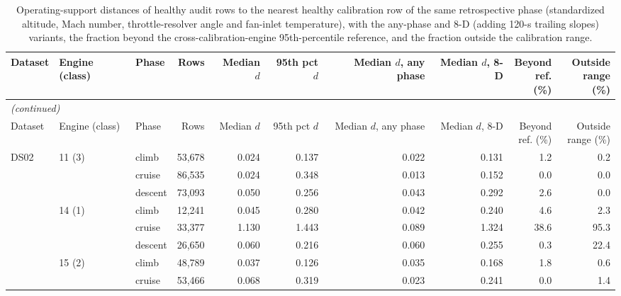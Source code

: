 \begin{scriptsize}
\begin{longtable}{lllrrrrrrr}
\caption{Operating-support distances of healthy audit rows to the nearest healthy calibration row of the same retrospective phase (standardized altitude, Mach number, throttle-resolver angle and fan-inlet temperature), with the any-phase and 8-D (adding 120-s trailing slopes) variants, the fraction beyond the cross-calibration-engine 95th-percentile reference, and the fraction outside the calibration range.}\label{tab:s20_support_cells}\\
\toprule
Dataset & Engine (class) & Phase & Rows & \makecell{Median\\$d$} & \makecell{95th pct\\$d$} & \makecell{Median $d$,\\any phase} & \makecell{Median\\$d$, 8-D} & \makecell{Beyond\\ref. (\%)} & \makecell{Outside\\range (\%)} \\
\midrule
\endfirsthead
\multicolumn{10}{l}{\emph{(continued)}}\\
\toprule
Dataset & Engine (class) & Phase & Rows & \makecell{Median\\$d$} & \makecell{95th pct\\$d$} & \makecell{Median $d$,\\any phase} & \makecell{Median\\$d$, 8-D} & \makecell{Beyond\\ref. (\%)} & \makecell{Outside\\range (\%)} \\
\midrule
\endhead
\bottomrule
\endfoot
DS02 & 11 (3) & climb & 53,678 & 0.024 & 0.137 & 0.022 & 0.131 & 1.2 & 0.2 \\
 &  & cruise & 86,535 & 0.024 & 0.348 & 0.013 & 0.152 & 0.0 & 0.0 \\
 &  & descent & 73,093 & 0.050 & 0.256 & 0.043 & 0.292 & 2.6 & 0.0 \\
 & 14 (1) & climb & 12,241 & 0.045 & 0.280 & 0.042 & 0.240 & 4.6 & 2.3 \\
 &  & cruise & 33,377 & 1.130 & 1.443 & 0.089 & 1.324 & 38.6 & 95.3 \\
 &  & descent & 26,650 & 0.060 & 0.216 & 0.060 & 0.255 & 0.3 & 22.4 \\
 & 15 (2) & climb & 48,789 & 0.037 & 0.126 & 0.035 & 0.168 & 1.8 & 0.6 \\
 &  & cruise & 53,466 & 0.068 & 0.319 & 0.023 & 0.241 & 0.0 & 1.4 \\

\end{longtable}
\end{scriptsize}
